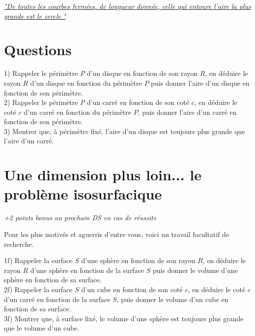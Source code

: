 \documentclass[frenchb]{article}
\begin{document}
\begin{center}

\underline{ \textit{"De toutes les courbes fermées, de longueur donnée, celle qui entoure l'aire la plus grande est le cercle."} }
\end{center}

\section*{Questions}

1) Rappeler le périmètre $P$ d'un disque en fonction de son  rayon $R$, en déduire le rayon $R$ d'un disque en fonction du périmètre $P$ puis donner l'aire d'un disque en fonction de son périmètre. \\

2) Rappeler le périmètre $P$ d'un carré en fonction de son coté $c$, en déduire le coté $c$ d'un carré en fonction du périmètre $P$, puis donner l'aire d'un carré en fonction de son périmètre. \\

3) Montrer que, à périmètre fixé, l'aire d'un disque est toujours plus grande que l'aire d'un carré.

\section*{Une dimension plus loin... le problème isosurfacique}


\begin{center}
\textit{+2 points bonus au prochain DS en cas de réussite}
\end{center}

Pour les plus motivés et aguerris d'entre vous, voici un travail facultatif de recherche.

1f) Rappeler la surface $S$ d'une sphère en fonction de son rayon $R$, en déduire le rayon $R$ d'une sphère en fonction de la surface $S$ puis donner le volume d'une sphère en fonction de sa surface. \\

2f) Rappeler la surface $S$ d'un cube en fonction de son coté $c$, en déduire le coté $c$ d'un carré en fonction de la surface $S$, puis donner le volume d'un cube en fonction de sa surface. \\

3f) Montrer que, à surface fixé, le volume d'une sphère est toujours plus grande que le volume d'un cube.\\
\end{document}
